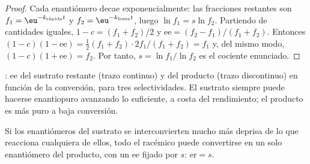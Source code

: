 \begin{proof}
Cada enantiómero decae exponencialmente: las fracciones restantes son $f_1 = \eu^{-k_{\text{rápida}}t}$ y
$f_2 = \eu^{-k_{\text{lenta}}t}$, luego $\ln f_1 = s\ln f_2$. Partiendo de cantidades iguales, $1 - c = (f_1 + f_2)/2$ y
$\mathrm{ee} = (f_2 - f_1)/(f_1 + f_2)$. Entonces $(1 - c)(1 - \mathrm{ee}) = \tfrac12(f_1 + f_2)\cdot 2f_1/(f_1 + f_2) = f_1$ y, del mismo modo,
$(1 - c)(1 + \mathrm{ee}) = f_2$. Por tanto, $s = \ln f_1/\ln f_2$ es el cociente enunciado.
\end{proof}

\begin{omfigure}

{\small {}: ee del sustrato restante (trazo continuo) y del
producto (trazo discontinuo) en función de la conversión, para tres selectividades. El sustrato
siempre puede hacerse enantiopuro avanzando lo suficiente, a costa del rendimiento; el
producto es más puro a baja conversión.}
\end{omfigure}

\begin{proposition}\label{prop:b3:asymmetric-synthesis:dkr}
Si los enantiómeros del sustrato se interconvierten mucho más deprisa de lo que reacciona cualquiera de ellos,
todo el racémico puede convertirse en un solo enantiómero del producto, con un ee fijado por $s$:
$\mathrm{er} = s$.
\end{proposition}


